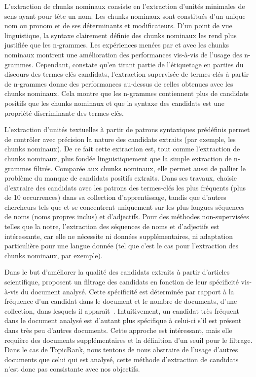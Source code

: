     L'extraction de chunks nominaux consiste en l'extraction d'unités
    minimales de sens ayant pour tête un nom. Les chunks nominaux sont
    constitués d'un unique nom ou pronom et de ses déterminants et
    modificateurs. D'un point de vue linguistique, la syntaxe clairement définie
    des chunks nominaux les rend plus justifiée que les n-grammes. Les
    expériences menées par  et
     avec les chunks nominaux montrent une
    amélioration des performances vis-à-vis de l'usage des n-grammes.
    Cependant,  constate qu'en tirant partie
    de l'étiquetage en parties du discours des termes-clés candidats,
    l'extraction supervisée de termes-clés à partir de n-grammes donne des
    performances au-dessus de celles obtenues avec les chunks nominaux. Cela
    montre que les n-grammes contiennent plus de candidats positifs que les
    chunks nominaux et que la syntaxe des candidats est une propriété
    discriminante des termes-clés.

    L'extraction d'unités textuelles à partir de patrons syntaxiques prédéfinis
    permet de contrôler avec précision la nature des candidats extraits (par
    exemple, les chunks nominaux). De ce fait cette extraction est, tout comme
    l'extraction de chunks nominaux, plus fondée linguistiquement que la simple
    extraction de n-grammes filtrés. Comparée aux chunks nominaux, elle permet
    aussi de pallier le problème du manque de candidats positifs extraits. Dans
    ses travaux,  choisie d'extraire des
    candidats avec les patrons des termes-clés les plus fréquents (plus de 10
    occurrences) dans sa collection d'apprentissage, tandis que d'autres
    chercheurs tels que  et
     se concentrent uniquement sur les plus
    longues séquences de noms (noms propres inclus) et d'adjectifs. Pour des
    méthodes non-supervisées telles que la notre, l'extraction des séquences de 
    noms et d'adjectifs est intéressante, car elle ne nécessite ni données
    supplémentaires, ni adaptation particulière pour une langue donnée (tel que
    c'est le cas pour l'extraction des chunks nominaux, par exemple).

    Dans le but d'améliorer la qualité des candidats extraits à partir
    d'articles scientifique,  proposent un
    filtrage des candidats en fonction de leur spécificité vis-à-vis du document
    analysé. Cette spécificité est déterminée par rapport à la fréquence d'un
    candidat dans le document et le nombre de documents, d'une collection, dans
    lesquels il apparaît~\cite[TF-IDF]{jones1972tfidf}. Intuitivement, un
    candidat très fréquent dans le document analysé est d'autant plus spécifique
    à celui-ci s'il est présent dans très peu d'autres documents. Cette approche
    est intéressant, mais elle requière des documents  supplémentaires et la
    définition d'un seuil pour le filtrage. Dans le cas de TopicRank, nous
    tentons de nous abstraire de l'usage d'autres documents que celui qui est
    analysé, cette méthode d'extraction de candidats n'est donc pas consistante
    avec nos objectifs.

